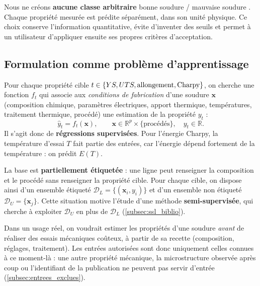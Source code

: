\begin{decision}
Nous ne créons \textbf{aucune classe arbitraire} \og bonne soudure / mauvaise soudure \fg{}.
Chaque propriété mesurée est prédite séparément, dans son unité physique. Ce choix
conserve l'information quantitative, évite d'inventer des seuils et permet à un
utilisateur d'appliquer ensuite ses propres critères d'acceptation.
\end{decision}

\subsection{Formulation comme problème d'apprentissage}

Pour chaque propriété cible $t \in \{YS, UTS, \text{allongement}, \text{Charpy}\}$,
on cherche une fonction $f_t$ qui associe aux \emph{conditions de fabrication}
d'une soudure $\bm{x}$ (composition chimique, paramètres électriques, apport
thermique, températures, traitement thermique, procédé) une estimation de la
propriété $y_t$ :
\begin{equation}
  \hat{y}_t = f_t(\bm{x}), \qquad \bm{x} \in \mathbb{R}^{p}\times\{\text{procédés}\},\quad y_t \in \mathbb{R}.
\end{equation}
Il s'agit donc de \textbf{régressions supervisées}. Pour l'énergie Charpy, la
température d'essai $T$ fait partie des entrées, car l'énergie dépend fortement
de la température : on prédit $E(T)$.

La base est \textbf{partiellement étiquetée} : une ligne peut renseigner la
composition et le procédé sans renseigner la propriété cible. Pour chaque cible,
on dispose ainsi d'un ensemble étiqueté $\mathcal{D}_L = \{(\bm{x}_i, y_i)\}$ et
d'un ensemble non étiqueté $\mathcal{D}_U = \{\bm{x}_j\}$. Cette situation motive
l'étude d'une méthode \textbf{semi-supervisée}, qui cherche à exploiter
$\mathcal{D}_U$ en plus de $\mathcal{D}_L$ (\cref{subsec:ssl_biblio}).

\begin{intuition}
Dans un usage réel, on voudrait estimer les propriétés d'une soudure \emph{avant}
de réaliser des essais mécaniques coûteux, à partir de sa recette (composition,
réglages, traitement). Les entrées autorisées sont donc uniquement celles
connues à ce moment-là : une autre propriété mécanique, la microstructure
observée après coup ou l'identifiant de la publication ne peuvent pas servir
d'entrée (\cref{subsec:entrees_exclues}).
\end{intuition}

